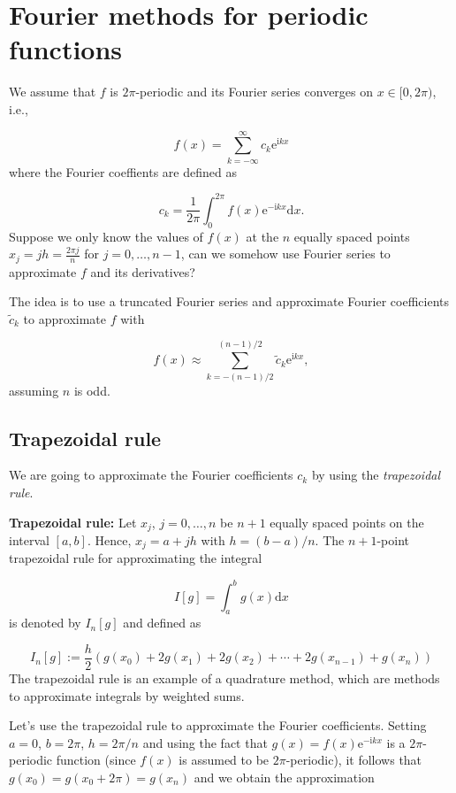\documentclass[12pt,landscape]{article}
\begin{document}
{\LARGE
\sf
\section{Fourier methods for periodic functions}
We assume that $f$ is $2\pi$-periodic and its Fourier series converges on $x \in [0, 2\pi)$, i.e.,

\[
f(x) = \sum_{k=-\infty}^{\infty} c_k \mathrm{e}^{\mathrm{i} k x}
\]
where the Fourier coeffients are defined as

\[
c_k = \frac{1}{2\pi}\int_{0}^{2\pi} f(x) \mathrm{e}^{-\mathrm{i}k x} \mathrm{d} x.
\]
Suppose we only know the values of $f(x)$ at the $n$ equally spaced points $x_{j} = jh = \frac{2\pi j}{n}$ for $j = 0, \ldots, n-1$, can we somehow use Fourier series to approximate $f$ and its derivatives?

The idea is to use a truncated Fourier series and approximate Fourier coefficients $\widetilde{c}_k$ to approximate $f$ with

\[
f(x) \approx \sum_{k=-(n-1)/2}^{(n-1)/2} \widetilde{c}_k \mathrm{e}^{\mathrm{i} k x},
\]
assuming $n$ is odd.

\subsection{Trapezoidal rule}
We are going to approximate the Fourier coefficients $c_k$ by using the \emph{trapezoidal rule}.

\textbf{Trapezoidal rule:} Let $x_{j}$, $j = 0, \ldots, n$ be $n+1$ equally spaced points on the interval $[a, b]$. Hence, $x_j = a + jh$ with $h = (b-a)/n$. The $n+1$-point trapezoidal rule for approximating the integral 

\[
I[g] = \int_{a}^{b} g(x) \mathrm{d} x 
\]
is denoted by $I_n[g]$ and defined as

\[
I_n[g] := \frac{h}{2}\left(g(x_0) + 2g(x_1) + 2g(x_2) + \cdots + 2g(x_{n-1}) + g(x_{n})    \right)
\]
The trapezoidal rule is an example of a quadrature method, which are methods to approximate integrals by weighted sums.

Let's use the trapezoidal rule to approximate the Fourier coefficients.  Setting $a = 0$, $b = 2\pi$, $h = 2\pi/n$ and using the fact that $g(x) = f(x)\mathrm{e}^{-\mathrm{i}k x}$ is a $2\pi$-periodic function (since $f(x)$ is assumed to be $2\pi$-periodic), it follows that $g(x_0) = g(x_0 + 2\pi) = g(x_n)$ and we obtain the approximation


}
\end{document}
